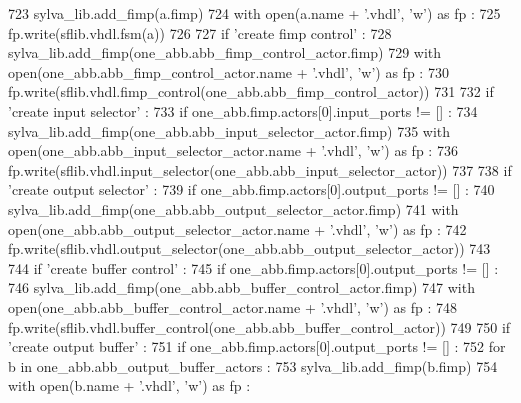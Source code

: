 \begin{DoxyCode}
723           sylva\_lib.add\_fimp(a.fimp)
724           with open(a.name + \textcolor{stringliteral}{'.vhdl'}, \textcolor{stringliteral}{'w'}) \textcolor{keyword}{as} fp :
725             fp.write(sflib.vhdl.fsm(a))
726 
727       \textcolor{keywordflow}{if} \textcolor{stringliteral}{'create fimp control'} :
728         sylva\_lib.add\_fimp(one\_abb.abb\_fimp\_control\_actor.fimp)
729         with open(one\_abb.abb\_fimp\_control\_actor.name + \textcolor{stringliteral}{'.vhdl'}, \textcolor{stringliteral}{'w'}) \textcolor{keyword}{as} fp :
730           fp.write(sflib.vhdl.fimp\_control(one\_abb.abb\_fimp\_control\_actor))
731 
732       \textcolor{keywordflow}{if} \textcolor{stringliteral}{'create input selector'} :
733         \textcolor{keywordflow}{if} one\_abb.fimp.actors[0].input\_ports != [] :
734           sylva\_lib.add\_fimp(one\_abb.abb\_input\_selector\_actor.fimp)
735           with open(one\_abb.abb\_input\_selector\_actor.name + \textcolor{stringliteral}{'.vhdl'}, \textcolor{stringliteral}{'w'}) \textcolor{keyword}{as} fp :
736             fp.write(sflib.vhdl.input\_selector(one\_abb.abb\_input\_selector\_actor))
737 
738       \textcolor{keywordflow}{if} \textcolor{stringliteral}{'create output selector'} :
739         \textcolor{keywordflow}{if} one\_abb.fimp.actors[0].output\_ports != [] :
740           sylva\_lib.add\_fimp(one\_abb.abb\_output\_selector\_actor.fimp)
741           with open(one\_abb.abb\_output\_selector\_actor.name + \textcolor{stringliteral}{'.vhdl'}, \textcolor{stringliteral}{'w'}) \textcolor{keyword}{as} fp :
742             fp.write(sflib.vhdl.output\_selector(one\_abb.abb\_output\_selector\_actor))
743 
744       \textcolor{keywordflow}{if} \textcolor{stringliteral}{'create buffer control'} :
745         \textcolor{keywordflow}{if} one\_abb.fimp.actors[0].output\_ports != [] :
746           sylva\_lib.add\_fimp(one\_abb.abb\_buffer\_control\_actor.fimp)
747           with open(one\_abb.abb\_buffer\_control\_actor.name + \textcolor{stringliteral}{'.vhdl'}, \textcolor{stringliteral}{'w'}) \textcolor{keyword}{as} fp :
748             fp.write(sflib.vhdl.buffer\_control(one\_abb.abb\_buffer\_control\_actor))
749 
750       \textcolor{keywordflow}{if} \textcolor{stringliteral}{'create output buffer'} :
751         \textcolor{keywordflow}{if} one\_abb.fimp.actors[0].output\_ports != [] :
752           \textcolor{keywordflow}{for} b \textcolor{keywordflow}{in} one\_abb.abb\_output\_buffer\_actors :
753             sylva\_lib.add\_fimp(b.fimp)
754             with open(b.name + \textcolor{stringliteral}{'.vhdl'}, \textcolor{stringliteral}{'w'}) \textcolor{keyword}{as} fp :

\end{DoxyCode}
